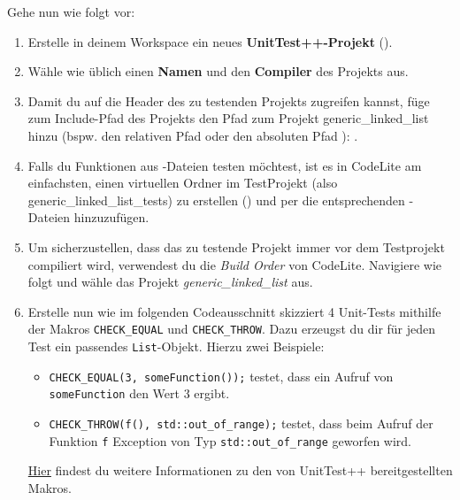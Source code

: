 Gehe nun wie folgt vor:
\begin{enumerate}
\item 
Erstelle in deinem Workspace ein neues \textbf{UnitTest++-Projekt} (). 

\item 
Wähle wie üblich einen \textbf{Namen} und den \textbf{Compiler} des Projekts aus.

\item 
Damit du auf die Header des zu testenden Projekts zugreifen kannst, füge zum Include-Pfad des Projekts den Pfad zum Projekt generic\_linked\_list hinzu (bspw. den relativen Pfad  oder den absoluten Pfad ):
.

\item 
Falls du Funktionen aus -Dateien testen möchtest, ist es in CodeLite am einfachsten, einen virtuellen Ordner im TestProjekt (also generic\_linked\_list\_tests) zu erstellen () und per  die entsprechenden -Dateien hinzuzufügen.

\item 
Um sicherzustellen, dass das zu testende Projekt immer vor dem Testprojekt compiliert wird, verwendest du die \emph{Build Order} von CodeLite.
Navigiere wie folgt  und wähle das Projekt \emph{generic\_linked\_list} aus. 

\item 
Erstelle nun wie im folgenden Codeausschnitt skizziert 4 Unit-Tests mithilfe der Makros \lstinline|CHECK_EQUAL| und \lstinline|CHECK_THROW|.
Dazu erzeugst du dir für jeden Test ein passendes \lstinline|List|-Objekt.
Hierzu zwei Beispiele:
\begin{itemize}
\item
\lstinline|CHECK_EQUAL(3, someFunction());| testet, dass ein Aufruf von \lstinline|someFunction| den Wert 3 ergibt.
\item 
\lstinline|CHECK_THROW(f(), std::out_of_range);| testet, dass beim Aufruf der Funktion \lstinline|f| Exception von Typ \lstinline|std::out_of_range| geworfen wird.
\end{itemize}
\href{https://github.com/unittest-cpp/unittest-cpp/wiki/Macro-and-Parameter-Reference}{Hier} findest du weitere Informationen zu den von UnitTest++ bereitgestellten Makros.
 

\end{enumerate}
